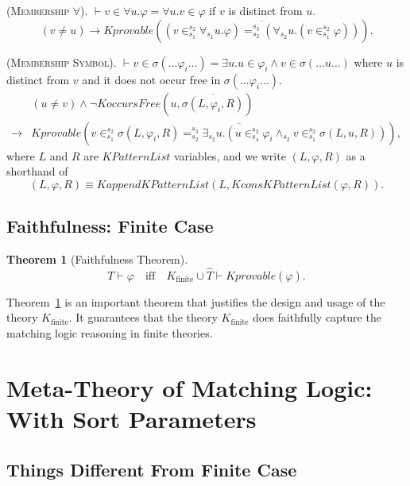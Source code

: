 \documentclass[UTF8,11pt]{article}
\newcounter{thmcounter}
\theoremstyle{plain}
\newtheorem{theorem}    [thmcounter]{Theorem}
\theoremstyle{definition}
\theoremstyle{remark}
\newcommand{\Kfinite}{{K_\text{finite}}}
\newcommand{\KPatternList}{\mathit{KPatternList}}
\newcommand{\KconsKPatternList}{\mathit{KconsKPatternList}}
\newcommand{\KappendKPatternList}{\mathit{KappendKPatternList}}
\newcommand{\KoccursFree}{\mathit{KoccursFree}}
\newcommand{\Kdeduce}{\mathit{Kprovable}}
\begin{document}
(\textsc{Membership $\forall$}).
$\vdash v \in \forall u . \varphi = \forall u . v \in \varphi$ if $v$ is 
distinct from $u$.
\begin{equation*}
(v \neq u)  \to \Kdeduce(\overline{(v \in_{s_1}^{s_2} \forall_{s_1} u . 
\varphi) =_{s_2}^{s_3} 
(\forall_{s_2} u . (v \in_{s_1}^{s_2} \varphi))}).
\end{equation*}

(\textsc{Membership Symbol}).
$\vdash v \in \sigma(\dots \varphi_i \dots) = \exists u . u \in \varphi_i 
\wedge v \in \sigma(\dots u \dots)$ where $u$ is distinct from $v$ and it does 
not occur free in $\sigma(\dots \varphi_i \dots)$.
\begin{align*}
& (u \neq v) 
  \wedge \neg \KoccursFree(u, \overline{\sigma(L, \varphi_i, R)})
\\
\to & \Kdeduce(\overline{v \in_{s_1}^{s_2} \sigma(L, \varphi_i, R) 
=_{s_2}^{s_3} \exists_{s_2} u . (u \in_{s_4}^{s_2} \varphi_i \wedge_{s_2} v 
\in_{s_1}^{s_2} \sigma(L, u, R))}),
\end{align*}
where $L$ and $R$ are $\KPatternList$ variables, and we write $(L, \varphi, R)$ as a shorthand of
$$(L, \varphi, R) \equiv \KappendKPatternList(L, \KconsKPatternList(\varphi, 
R)).$$

\subsection{Faithfulness: Finite Case}

\begin{theorem}[Faithfulness Theorem]\label{thm:faithfulness-finite}
	$$T \vdash \varphi \quad \text{iff} \quad \Kfinite \cup \widehat{T} \vdash 
	\Kdeduce(\hat{\varphi}).$$
\end{theorem}

Theorem~\ref{thm:faithfulness-finite} is an important theorem that justifies the design and usage of the theory $\Kfinite$. 
It guarantees that the theory $\Kfinite$ does faithfully capture the matching logic reasoning in finite theories.


\section{Meta-Theory of Matching Logic: With Sort Parameters}
\label{sec:meta-theory-sort-parameters}
\subsection{Things Different From Finite Case}
\end{document}
